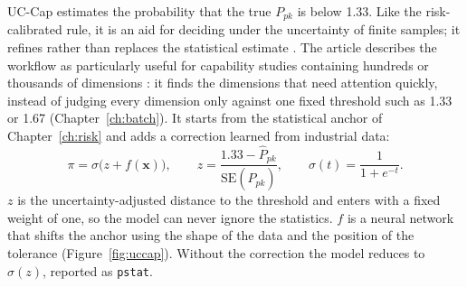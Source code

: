\documentclass[a4paper,11pt,oneside,openany,parskip=half-,headings=standardclasses,toc=flat,numbers=noenddot]{scrbook}
\newcommand{\code}[1]{\texttt{\begingroup\def\_{\textunderscore\allowbreak}#1\endgroup}}
\newcommand{\chapref}[1]{Chapter~\ref{#1}}
\newcommand{\figref}[1]{Figure~\ref{#1}}
\newcommand{\Ppkhat}{\widehat{P}_{pk}}
\begin{document}
UC-Cap estimates the probability that the true $P_{pk}$ is below 1.33. Like the risk-calibrated rule, it is an
aid for deciding under the uncertainty of finite samples; it refines rather than replaces the statistical estimate
\cite[Sec.~6.1]{jy-hybrid}. The article describes the workflow as particularly useful for capability studies containing hundreds or thousands of
dimensions \cite[Sec.~5.2]{jy-hybrid}: it finds the dimensions that need attention quickly, instead of judging every
dimension only against one fixed threshold such as 1.33 or 1.67 (\chapref{ch:batch}).
It starts from the statistical anchor of \chapref{ch:risk} and adds a correction learned from industrial data:
\begin{equation}\label{eq:uccap}
\pi = \sigma\bigl(z + f(\mathbf{x})\bigr), \qquad
z = \frac{1.33 - \Ppkhat}{\mathrm{SE}(\Ppkhat)}, \qquad \sigma(t) = \frac{1}{1+e^{-t}} .
\end{equation}
$z$ is the uncertainty-adjusted distance to the threshold and enters with a fixed weight of one, so the model
can never ignore the statistics. $f$ is a neural network that shifts the anchor using the shape of the data and
the position of the tolerance (\figref{fig:uccap}). Without the correction the model reduces to $\sigma(z)$,
reported as \code{p\_stat}.
\end{document}
